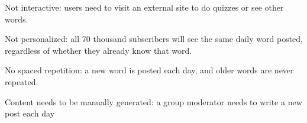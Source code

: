 \documentclass{chi-ext}
\begin{document}

\begin{compactitem}
\item Not interactive: users need to visit an external site to do quizzes or see other words.
\item Not personalized: all 70 thousand subscribers will see the same daily word posted, regardless of whether they already know that word.
\item No spaced repetition: a new word is posted each day, and older words are never repeated.
\item Content needs to be manually generated: a group moderator needs to write a new post each day
\end{compactitem}


\end{document}
